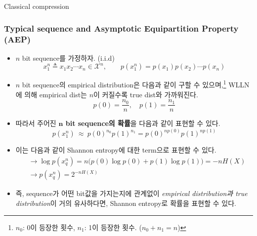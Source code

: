\documentclass[9pt]{beamer}
\begin{document}
    \begin{section}{Classical compression}
        \begin{frame}
            \frametitle{Typical sequence and Asymptotic Equipartition Property (AEP)}
            \begin{itemize}
                \item $n$ bit sequence를 가정하자. (i.i.d)
                \begin{equation*}
                    x^n_1 \triangleq x_1x_2 \cdots x_n \in \mathcal X^{n}, \qquad p(x^n_1) = p(x_1)p(x_2) \cdots p(x_n)
                \end{equation*}
                \item $n$ bit sequence의 empirical distribution은 다음과 같이 구할 수 있으며,\footnote{$n_0$: 0이 등장한 횟수, $n_1$: 1이 등장한 횟수. ($n_0 + n_1 = n$)} WLLN에 의해 empirical dist는 $n$이 커질수록 true dist와 가까워진다.
                \begin{equation*}
                    p(0) = \frac{n_0}{n}, \quad p(1) = \frac{n_1}{n}
                \end{equation*}
                \item 따라서 주어진 \textbf{$\mathbf n$ bit sequence의 확률}을 다음과 같이 표현할 수 있다.
                \begin{equation*}
                    p(x^n_1) \ \approx \ p(0)^{n_0}  p(1)^{n_1} = p(0)^{n p(0)}  p(1)^{n p(1)} 
                \end{equation*}
                \item 이는 다음과 같이 \alert{Shannon entropy}에 대한 term으로 표현할 수 있다.
                \begin{align*}
                    &\rightarrow \log p(x_q^n) = n\Big(p(0) \log p(0) + p(1) \log p(1)\Big) = -n H(X)\\
                    &\rightarrow p(x_q^n) = \boxed{2^{-n H(X)}}
                \end{align*}
                \item 즉, sequence가 어떤 bit값을 가지는지에 관계없이 \textit{empirical distribution과 true distribution}이 거의 유사하다면, Shannon entropy로 확률을 표현할 수 있다.
            \end{itemize}
        \end{frame}


\end{section}
\end{document}
